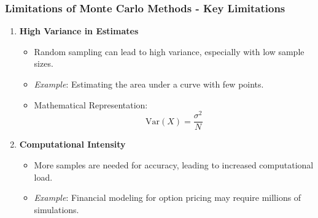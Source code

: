 \documentclass[aspectratio=169]{beamer}
\begin{document}
\begin{frame}[fragile]
    \frametitle{Limitations of Monte Carlo Methods - Key Limitations}
    \begin{enumerate}
        \item \textbf{High Variance in Estimates}
            \begin{itemize}
                \item Random sampling can lead to high variance, especially with low sample sizes.
                \item \textit{Example}: Estimating the area under a curve with few points.
                \item Mathematical Representation:
                \begin{equation}
                    \text{Var}(X) = \frac{\sigma^2}{N}
                \end{equation}
            \end{itemize}
        \item \textbf{Computational Intensity}
            \begin{itemize}
                \item More samples are needed for accuracy, leading to increased computational load.
                \item \textit{Example}: Financial modeling for option pricing may require millions of simulations.
            \end{itemize}
    \end{enumerate}
\end{frame}
\end{document}
